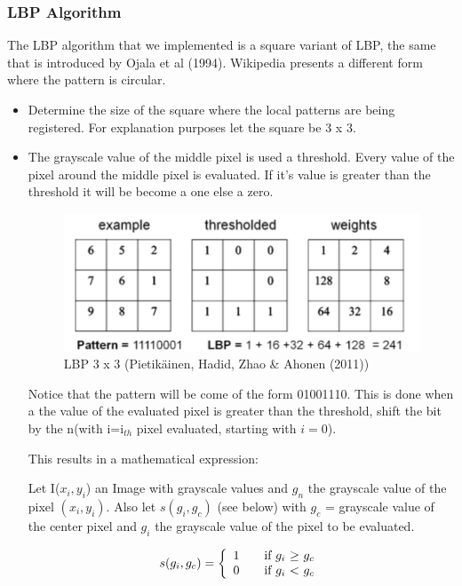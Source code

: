 \documentclass[a4paper]{article}
\begin{document}
\subsubsection{LBP Algorithm}
The LBP algorithm that we implemented is a square variant of LBP, the same
that is introduced by Ojala et al (1994). Wikipedia presents a different
form where the pattern is circular. 
\begin{itemize}
\item Determine the size of the square where the local patterns are being
registered. For explanation purposes let the square be 3 x 3. \\
\item The grayscale value of the middle pixel is used a threshold. Every value
of the pixel around the middle pixel is evaluated. If it's value is greater
than the threshold it will be become a one else a zero.

\begin{figure}[h!]
\center
\includegraphics[scale=0.5]{lbp.png}
\caption{LBP 3 x 3 (Pietik\"ainen, Hadid, Zhao \& Ahonen (2011))}
\end{figure}

Notice that the pattern will be come of the form 01001110. This is done when a
the value of the evaluated pixel is greater than the threshold, shift the bit
by the n(with i=i$_{th}$ pixel evaluated, starting with $i=0$).

This results in a mathematical expression:

Let I($x_i, y_i$) an Image with grayscale values and $g_n$ the grayscale value
of the pixel $(x_i, y_i)$. Also let $s(g_i, g_c)$ (see below) with $g_c$ = grayscale value
of the center pixel and $g_i$ the grayscale value of the pixel to be evaluated.

$$
  s(g_i, g_c) = \left\{
  \begin{array}{l l}
    1 & \quad \text{if $g_i$ $\geq$ $g_c$}\\
    0 & \quad \text{if $g_i$ $<$ $g_c$}\\
  \end{array} \right.
$$


\end{itemize}
\end{document}
